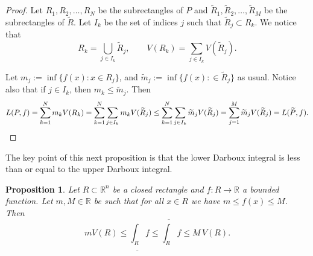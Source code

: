 \documentclass[12pt]{book}
\newcommand{\R}{{\mathbb{R}}}
\theoremstyle{plain}
\newtheorem{prop}[thm]{Proposition}
\theoremstyle{remark}
\theoremstyle{definition}
\theoremstyle{exercise}
\theoremstyle{example}
\begin{document}
\begin{proof}
Let $R_1,R_2,\ldots,R_N$ be the subrectangles of $P$
and
$\widetilde{R}_1,\widetilde{R}_2,\ldots,\widetilde{R}_M$ be the subrectangles of
$\widetilde{R}$.
Let $I_k$ be the set of indices $j$ such that $\widetilde{R}_j \subset R_k$.  We
notice that
\begin{equation*}
R_k = \bigcup_{j \in I_k} \widetilde{R}_j,
\qquad
V(R_k) = \sum_{j \in I_k} V(\widetilde{R}_j).
\end{equation*}

Let $m_j := \inf \{ f(x) : x \in R_j \}$, and
$\widetilde{m}_j := \inf \{ f(x) : \in \widetilde{R}_j \}$ as usual.
Notice also that if $j \in I_k$, then $m_k \leq \widetilde{m}_j$.  Then
\begin{equation*}
L(P,f) =
\sum_{k=1}^N m_k V(R_k)
=
\sum_{k=1}^N \sum_{j\in I_k} m_k V(\widetilde{R}_j)
\leq
\sum_{k=1}^N \sum_{j\in I_k} \widetilde{m}_j V(\widetilde{R}_j)
=
\sum_{j=1}^M \widetilde{m}_j V(\widetilde{R}_j) = L(\widetilde{P},f) . \qedhere
\end{equation*}
\end{proof}

The key point of this next proposition is that
the lower Darboux integral is less than or equal to the upper Darboux
integral.

\begin{prop} \label{mv:intulbound:prop}
Let $R \subset \R^n$ be a closed rectangle and
$f \colon R \to \R$ a bounded function.  Let $m, M \in \R$ be 
such that for all $x \in R$ we have $m \leq f(x) \leq M$.  Then
\begin{equation}
\label{mv:intulbound:eq}
m V(R) \leq
\underline{\int_R} f \leq \overline{\int_R} f
\leq M \, V(R).
\end{equation}
\end{prop}
\end{document}

